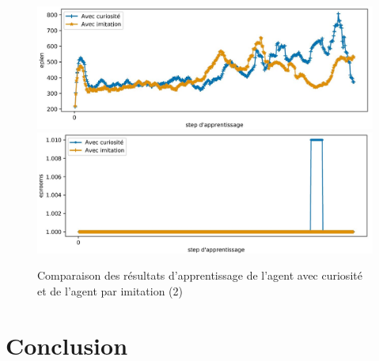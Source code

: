 \documentclass[a4paper,12pt]{report}
\begin{document}
\begin{figure}[H]
    \centering
    \includegraphics[width=\textwidth]{curiosity_imitation/curiosity_imitation_eplen.JPG}
    \includegraphics[width=\textwidth]{curiosity_imitation/curiosity_imitation_eprooms.JPG}
    \caption{Comparaison des résultats d'apprentissage de l'agent avec curiosité et de l'agent par imitation (2)}
\end{figure}

\section*{Conclusion}
\end{document}
